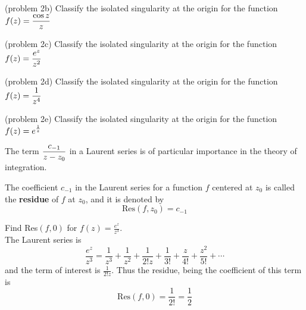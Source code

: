 \documentclass[handout]{ximera}
\begin{document}
\begin{problem}(problem 2b)
Classify the isolated singularity at the origin for the function $\displaystyle f(z) = \frac{\cos z}{z}$
\begin{multipleChoice}
\end{multipleChoice}\end{problem}


\begin{problem}(problem 2c)
Classify the isolated singularity at the origin for the function $\displaystyle f(z) = \frac{e^z}{z^2}$
\begin{multipleChoice}
\end{multipleChoice}
\end{problem}


\begin{problem}(problem 2d)
Classify the isolated singularity at the origin for the function $\displaystyle f(z) = \frac{1}{z^4}$
\begin{multipleChoice}
\end{multipleChoice}
\end{problem}


\begin{problem}(problem 2e)
Classify the isolated singularity at the origin for the function $\displaystyle f(z) = e^\frac{1}{z}$
\begin{multipleChoice}
\end{multipleChoice}\end{problem}

The term $\displaystyle \frac{c_{-1}}{z-z_0}$ in a Laurent series is of particular importance in the theory of integration.

\begin{definition}
The coefficient $c_{-1}$ in the Laurent series for a function $f$ centered at $z_0$ is called the \textbf{residue} of $f$ at $z_0$, and it is denoted by
\[
\text{Res}(f,z_0) = c_{-1}
\]
\end{definition}


\begin{example}[example 3]
Find Res$(f,0)$ for $f(z) = \frac{e^z}{z^3}$.\\
The Laurent series is
\[
\frac{e^z}{z^3} = \frac{1}{z^3} + \frac{1}{z^2} + \frac{1}{2!z} + \frac{1}{3!} + \frac{z}{4!} + \frac{z^2}{5!} + \cdots
\]
and the term of interest is $ \frac{1}{2!z}$. Thus the residue, being the coefficient of this term is
\[
\text{Res}(f,0) = \frac{1}{2!} = \frac12
\]
\end{example}
\end{document}
